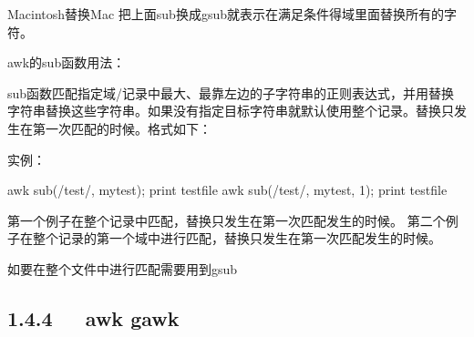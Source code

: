 \documentclass[letterpaper,12pt,english]{sphinxmanual}
\begin{document}
\begin{sphinxVerbatim}[commandchars=\\\{\}]
   
   
\end{sphinxVerbatim}

Macintosh替换Mac
把上面sub换成gsub就表示在满足条件得域里面替换所有的字符。

awk的sub函数用法：

sub函数匹配指定域/记录中最大、最靠左边的子字符串的正则表达式，并用替换字符串替换这些字符串。如果没有指定目标字符串就默认使用整个记录。替换只发生在第一次匹配的时候。格式如下：

\begin{sphinxVerbatim}[commandchars=\\\{\}]
    
      
\end{sphinxVerbatim}

实例：

\begin{sphinxVerbatim}[commandchars=\\\{\}]
\PYGZdl{} awk \PYGZsq{}\PYGZob{} sub(/test/, \PYGZdq{}mytest\PYGZdq{}); print \PYGZcb{}\PYGZsq{} testfile
\PYGZdl{} awk \PYGZsq{}\PYGZob{} sub(/test/, \PYGZdq{}mytest\PYGZdq{}, \PYGZdl{}1); print \PYGZcb{}\PYGZsq{} testfile
\end{sphinxVerbatim}

第一个例子在整个记录中匹配，替换只发生在第一次匹配发生的时候。
第二个例子在整个记录的第一个域中进行匹配，替换只发生在第一次匹配发生的时候。

如要在整个文件中进行匹配需要用到gsub


\subsection{1.4.4   awk gawk}
\label{\detokenize{001software/001install/linux:awk-gawk}}
\end{document}
